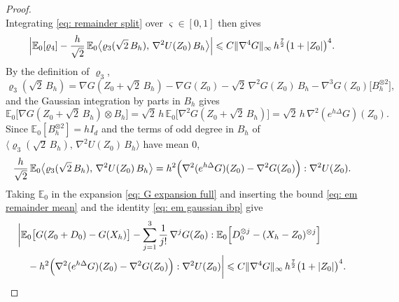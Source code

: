 \begin{proof}
\begin{equation*}
    \end{equation*}
    Integrating \eqref{eq: remainder split} over $\varsigma \in [0,1]$ then gives
    \begin{equation}
        \Bigl| \mathbb E_0[\varrho_4] - \frac{h}{\sqrt2}\, \mathbb E_0 \bigl\langle \varrho_3(\sqrt2\, B_h),\, \nabla^2 U(Z_0)\, B_h \bigr\rangle \Bigr| \leqslant C \lVert \nabla^4 G \rVert_\infty\, h^{\frac72} \bigl( 1 + |Z_0| \bigr)^4 .
        \label{eq: em remainder mean}
    \end{equation}
    By the definition of $\varrho_3$,
    \begin{equation*}
        \varrho_3(\sqrt2\, B_h) = \nabla G(Z_0 + \sqrt2\, B_h) - \nabla G(Z_0) - \sqrt2\, \nabla^2 G(Z_0)\, B_h - \nabla^3 G(Z_0)\bigl[ B_h^{\otimes 2} \bigr] ,
    \end{equation*}
    and the Gaussian integration by parts in $B_h$ gives
    \begin{equation*}
        \mathbb E_0\bigl[ \nabla G(Z_0 + \sqrt2\, B_h) \otimes B_h \bigr] = \sqrt2\, h\, \mathbb E_0\bigl[ \nabla^2 G(Z_0 + \sqrt2\, B_h) \bigr] = \sqrt2\, h\, \nabla^2 ( e^{h\Delta} G )(Z_0) .
    \end{equation*}
    Since $\mathbb E_0[ B_h^{\otimes 2} ] = h I_d$ and the terms of odd degree in $B_h$ of $\bigl\langle \varrho_3(\sqrt2\, B_h),\, \nabla^2 U(Z_0)\, B_h \bigr\rangle$ have mean $0$,
    \begin{equation}
        \frac{h}{\sqrt2}\, \mathbb E_0 \bigl\langle \varrho_3(\sqrt2\, B_h),\, \nabla^2 U(Z_0)\, B_h \bigr\rangle = h^2 \Bigl( \nabla^2 ( e^{h\Delta} G )(Z_0) - \nabla^2 G(Z_0) \Bigr) : \nabla^2 U(Z_0) .
        \label{eq: em gaussian ibp}
    \end{equation}
    Taking $\mathbb E_0$ in the expansion \eqref{eq: G expansion full} and inserting the bound \eqref{eq: em remainder mean} and the identity \eqref{eq: em gaussian ibp} give
    \begin{equation}
    \begin{aligned}
        & \biggl| \mathbb E_0\bigl[ G(Z_0 + D_0) - G(X_h) \bigr] - \sum_{j=1}^{3} \frac{1}{j!}\, \nabla^j G(Z_0) : \mathbb E_0\Bigl[ D_0^{\otimes j} - (X_h - Z_0)^{\otimes j} \Bigr] \\
        & \quad - h^2 \Bigl( \nabla^2 ( e^{h\Delta} G )(Z_0) - \nabla^2 G(Z_0) \Bigr) : \nabla^2 U(Z_0) \biggr| \leqslant C \lVert \nabla^4 G \rVert_\infty\, h^{\frac72} \bigl( 1 + |Z_0| \bigr)^4 .
    \end{aligned}
        \label{eq: sgld em expansion}
    \end{equation}

\end{proof}
